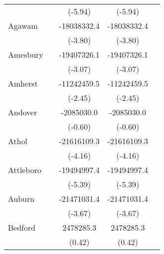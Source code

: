 {\begin{tabular}{l*{4}{c}}
                    &                     &     (-5.94)         &     (-5.94)         &                     \\
\addlinespace
Agawam              &                     & -18038332.4\sym{***}& -18038332.4\sym{***}&                     \\
                    &                     &     (-3.80)         &     (-3.80)         &                     \\
\addlinespace
Amesbury            &                     & -19407326.1\sym{**} & -19407326.1\sym{**} &                     \\
                    &                     &     (-3.07)         &     (-3.07)         &                     \\
\addlinespace
Amherst             &                     & -11242459.5\sym{*}  & -11242459.5\sym{*}  &                     \\
                    &                     &     (-2.45)         &     (-2.45)         &                     \\
\addlinespace
Andover             &                     &  -2085030.0         &  -2085030.0         &                     \\
                    &                     &     (-0.60)         &     (-0.60)         &                     \\
\addlinespace
Athol               &                     & -21616109.3\sym{***}& -21616109.3\sym{***}&                     \\
                    &                     &     (-4.16)         &     (-4.16)         &                     \\
\addlinespace
Attleboro           &                     & -19494997.4\sym{***}& -19494997.4\sym{***}&                     \\
                    &                     &     (-5.39)         &     (-5.39)         &                     \\
\addlinespace
Auburn              &                     & -21471031.4\sym{***}& -21471031.4\sym{***}&                     \\
                    &                     &     (-3.67)         &     (-3.67)         &                     \\
\addlinespace
Bedford             &                     &   2478285.3         &   2478285.3         &                     \\
                    &                     &      (0.42)         &      (0.42)         &                     \\

\end{tabular}}
